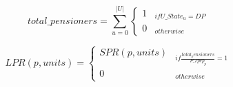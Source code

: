 \begin{equation}
total\_pensioners =  \sum_{u=0}^{|U|} \begin{cases} 
1  & _{if U\_State_{u} = DP}\\
0 & _{otherwise}
\end{cases}
\end{equation}

\begin{equation}
LPR(p, units) =  \begin{cases} 
SPR(p, units)  & _{if \frac{total_pensioners} {P\_Tpep_{p}} = 1}\\
0 & _{otherwise}
\end{cases}
\end{equation}$  $